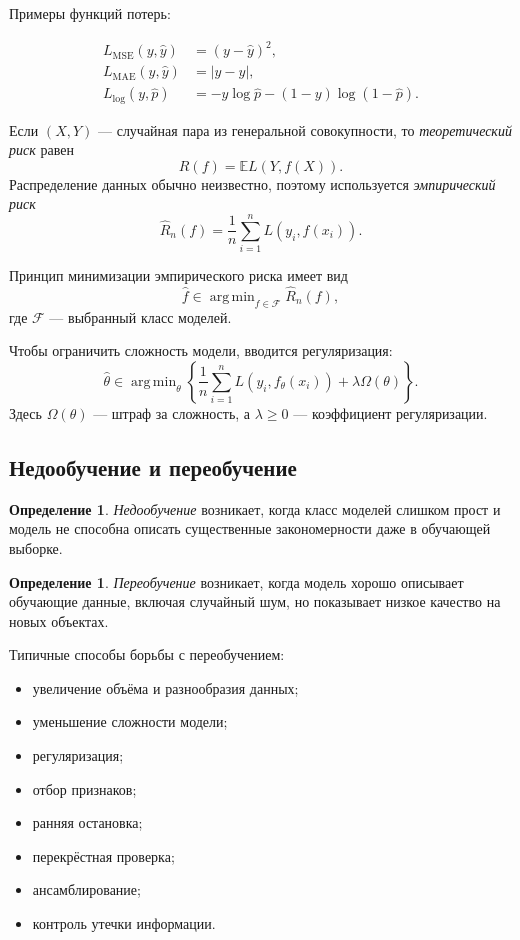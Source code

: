 \documentclass[12pt,a4paper]{article}
\theoremstyle{definition}
\newtheorem{definition}[theorem]{Определение}
\theoremstyle{remark}
\newcommand{\E}{\mathbb{E}}
\DeclareMathOperator*{\argmin}{arg\,min}
\begin{document}
Примеры функций потерь:

\begin{align*}
    L_{\mathrm{MSE}}(y,\widehat y)
        &= (y-\widehat y)^2,\\
    L_{\mathrm{MAE}}(y,\widehat y)
        &= |y-\widehat y|,\\
    L_{\mathrm{log}}(y,\widehat p)
        &= -y\log\widehat p-(1-y)\log(1-\widehat p).
\end{align*}

Если $(X,Y)$ --- случайная пара из генеральной совокупности, то
\emph{теоретический риск} равен
\[
    R(f)=\E L(Y,f(X)).
\]
Распределение данных обычно неизвестно, поэтому используется
\emph{эмпирический риск}
\[
    \widehat R_n(f)
    =
    \frac{1}{n}\sum_{i=1}^{n}L(y_i,f(x_i)).
\]

Принцип минимизации эмпирического риска имеет вид
\[
    \widehat f
    \in
    \argmin_{f\in\mathcal{F}}\widehat R_n(f),
\]
где $\mathcal{F}$ --- выбранный класс моделей.

Чтобы ограничить сложность модели, вводится регуляризация:
\[
    \widehat\theta
    \in
    \argmin_{\theta}
    \left\{
        \frac{1}{n}\sum_{i=1}^{n}
        L(y_i,f_\theta(x_i))
        +
        \lambda\Omega(\theta)
    \right\}.
\]
Здесь $\Omega(\theta)$ --- штраф за сложность, а $\lambda\geq 0$ ---
коэффициент регуляризации.

\subsection{Недообучение и переобучение}

\begin{definition}
\emph{Недообучение} возникает, когда класс моделей слишком прост и модель
не способна описать существенные закономерности даже в обучающей выборке.
\end{definition}

\begin{definition}
\emph{Переобучение} возникает, когда модель хорошо описывает обучающие данные,
включая случайный шум, но показывает низкое качество на новых объектах.
\end{definition}

Типичные способы борьбы с переобучением:

\begin{itemize}
    \item увеличение объёма и разнообразия данных;
    \item уменьшение сложности модели;
    \item регуляризация;
    \item отбор признаков;
    \item ранняя остановка;
    \item перекрёстная проверка;
    \item ансамблирование;
    \item контроль утечки информации.
\end{itemize}
\end{document}

